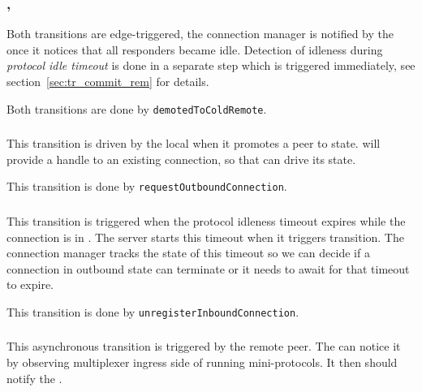 \subsubsection{\DemotedToColdUniRem{}, \DemotedToColdDupRem{}}
Both transitions are edge-triggered, the connection manager is notified by the
\inbgov{} once it notices that all responders became idle. Detection of
idleness during \textit{protocol idle timeout} is done in a separate step which
is triggered immediately, see section~\ref{sec:tr_commit_rem} for details.

\begin{detail}
  Both transitions are done by \texttt{demotedToColdRemote}.
\end{detail}


\subsubsection{\PromotedToWarmDupLoc{}}
This transition is driven by the local \ptopgov{} when it promotes a \cold{} peer
to \warm{} state. \connmngr{} will provide a handle to an existing connection, so that
\ptopgov{} can drive its state.

\begin{detail}
This transition is done by \texttt{requestOutboundConnection}.
\end{detail}


\subsubsection{\TimeoutExpired{}}
This transition is triggered when the protocol idleness timeout expires while
the connection is in \OutboundStateDupTau{}. The server starts this timeout
when it triggers \DemotedToColdAnyRem{} transition. The connection manager
tracks the state of this timeout so we can decide if a connection in outbound
state can terminate or it needs to await for that timeout to expire.

\begin{detail}
  This transition is done by \texttt{unregisterInboundConnection}.
\end{detail}


\subsubsection{\PromotedToWarmDupRem{}}
This asynchronous transition is triggered by the remote peer.  The \inbgov{}
can notice it by observing multiplexer ingress side of running mini-protocols.
It then should notify the \connmngr{}.

